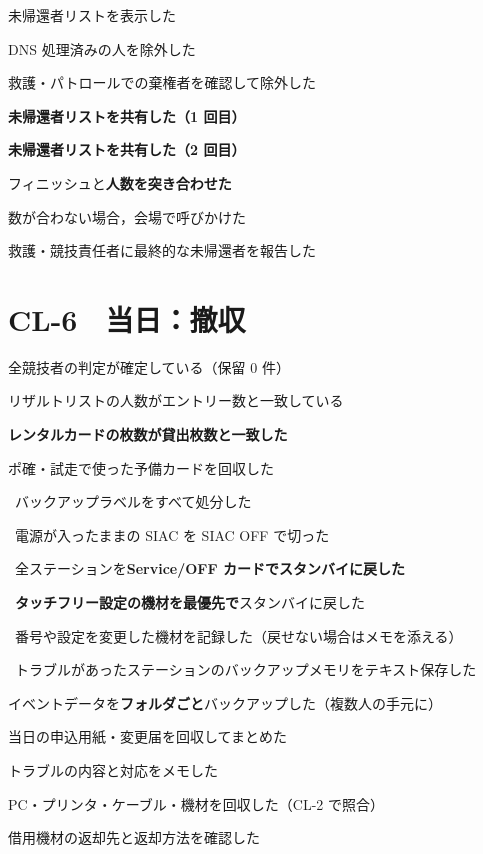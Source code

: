 \begin{cklist}
\item 未帰還者リストを表示した
\item DNS 処理済みの人を除外した
\item 救護・パトロールでの棄権者を確認して除外した
\item \textbf{未帰還者リストを共有した（1 回目）}
\end{cklist}

\begin{cklist}
\item \textbf{未帰還者リストを共有した（2 回目）}
\item フィニッシュと\textbf{人数を突き合わせた}
\item 数が合わない場合，会場で呼びかけた
\item 救護・競技責任者に最終的な未帰還者を報告した
\end{cklist}

\ckfoot

\clearpage
\section*{CL-6　当日：撤収}

\begin{cklist}
\item 全競技者の判定が確定している（保留 0 件）
\item リザルトリストの人数がエントリー数と一致している
\item \textbf{レンタルカードの枚数が貸出枚数と一致した}
\item ポ確・試走で使った予備カードを回収した
\item \tEMIT\ バックアップラベルをすべて処分した
\item \tSIAC\ 電源が入ったままの SIAC を SIAC OFF で切った
\item \tSI\ 全ステーションを\textbf{Service/OFF カードでスタンバイに戻した}
\item \tSI\ \textbf{タッチフリー設定の機材を最優先で}スタンバイに戻した
\item \tSI\ 番号や設定を変更した機材を記録した（戻せない場合はメモを添える）
\item \tSI\ トラブルがあったステーションのバックアップメモリをテキスト保存した
\item イベントデータを\textbf{フォルダごと}バックアップした（複数人の手元に）
\item 当日の申込用紙・変更届を回収してまとめた
\item トラブルの内容と対応をメモした
\item PC・プリンタ・ケーブル・機材を回収した（CL-2 で照合）
\item 借用機材の返却先と返却方法を確認した
\end{cklist}

